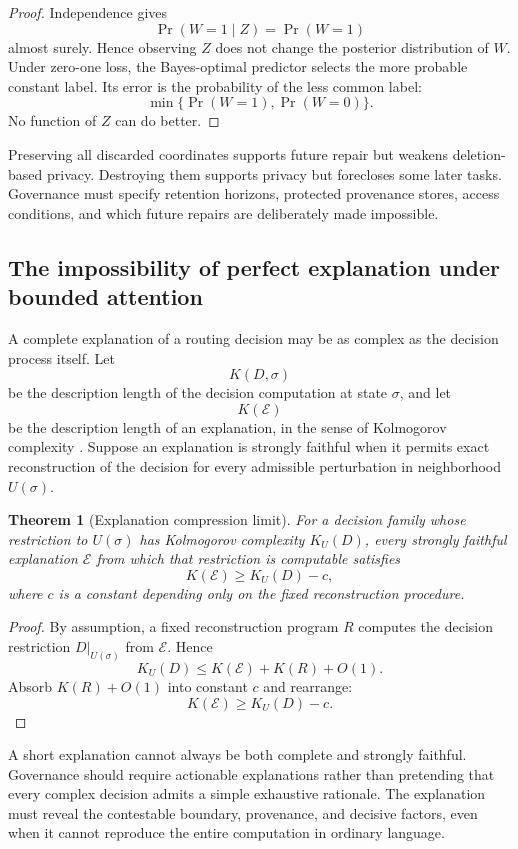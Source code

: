 \documentclass[11pt]{article}
\newtheorem{theorem}[definition]{Theorem}
\theoremstyle{definition}
\DeclareMathOperator{\Prob}{Pr}
\begin{document}
\begin{proof}
Independence gives
\[
\Prob(W=1\mid Z)=\Prob(W=1)
\]
almost surely. Hence observing \(Z\) does not change the posterior distribution of \(W\). Under zero-one loss, the Bayes-optimal predictor selects the more probable constant label. Its error is the probability of the less common label:
\[
\min\{\Prob(W=1),\Prob(W=0)\}.
\]
No function of \(Z\) can do better.
\end{proof}

Preserving all discarded coordinates supports future repair but weakens deletion-based privacy. Destroying them supports privacy but forecloses some later tasks. Governance must specify retention horizons, protected provenance stores, access conditions, and which future repairs are deliberately made impossible.

\subsection{The impossibility of perfect explanation under bounded attention}

A complete explanation of a routing decision may be as complex as the decision process itself. Let
\[
K(D,\sigma)
\]
be the description length of the decision computation at state \(\sigma\), and let
\[
K(\mathcal{E})
\]
be the description length of an explanation, in the sense of Kolmogorov complexity \cite{li2019}. Suppose an explanation is strongly faithful when it permits exact reconstruction of the decision for every admissible perturbation in neighborhood \(U(\sigma)\).

\begin{theorem}[Explanation compression limit]
For a decision family whose restriction to \(U(\sigma)\) has Kolmogorov complexity \(K_U(D)\), every strongly faithful explanation \(\mathcal{E}\) from which that restriction is computable satisfies
\[
K(\mathcal{E})
\geq
K_U(D)-c,
\]
where \(c\) is a constant depending only on the fixed reconstruction procedure.
\end{theorem}

\begin{proof}
By assumption, a fixed reconstruction program \(R\) computes the decision restriction \(D|_{U(\sigma)}\) from \(\mathcal{E}\). Hence
\[
K_U(D)
\leq
K(\mathcal{E})+K(R)+O(1).
\]
Absorb \(K(R)+O(1)\) into constant \(c\) and rearrange:
\[
K(\mathcal{E})
\geq
K_U(D)-c.
\]
\end{proof}

A short explanation cannot always be both complete and strongly faithful. Governance should require actionable explanations rather than pretending that every complex decision admits a simple exhaustive rationale. The explanation must reveal the contestable boundary, provenance, and decisive factors, even when it cannot reproduce the entire computation in ordinary language.
\end{document}
